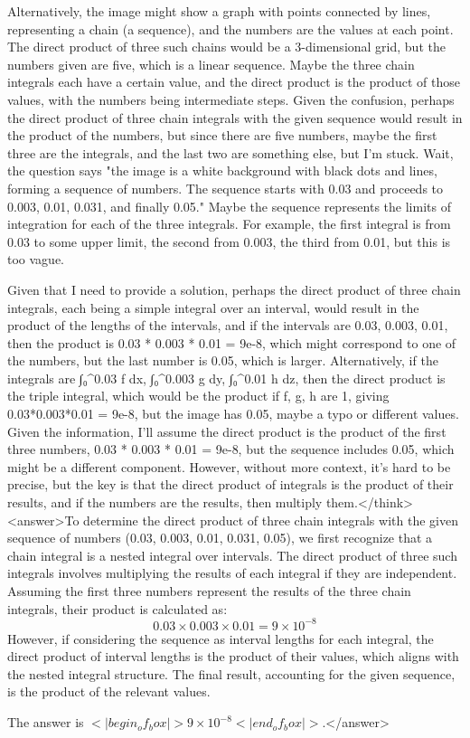 Alternatively, the image might show a graph with points connected by lines, representing a chain (a sequence), and the numbers are the values at each point. The direct product of three such chains would be a 3-dimensional grid, but the numbers given are five, which is a linear sequence. Maybe the three chain integrals each have a certain value, and the direct product is the product of those values, with the numbers being intermediate steps. Given the confusion, perhaps the direct product of three chain integrals with the given sequence would result in the product of the numbers, but since there are five numbers, maybe the first three are the integrals, and the last two are something else, but I'm stuck. Wait, the question says "the image is a white background with black dots and lines, forming a sequence of numbers. The sequence starts with 0.03 and proceeds to 0.003, 0.01, 0.031, and finally 0.05." Maybe the sequence represents the limits of integration for each of the three integrals. For example, the first integral is from 0.03 to some upper limit, the second from 0.003, the third from 0.01, but this is too vague.

Given that I need to provide a solution, perhaps the direct product of three chain integrals, each being a simple integral over an interval, would result in the product of the lengths of the intervals, and if the intervals are 0.03, 0.003, 0.01, then the product is 0.03 * 0.003 * 0.01 = 9e-8, which might correspond to one of the numbers, but the last number is 0.05, which is larger. Alternatively, if the integrals are ∫₀^0.03 f dx, ∫₀^0.003 g dy, ∫₀^0.01 h dz, then the direct product is the triple integral, which would be the product if f, g, h are 1, giving 0.03*0.003*0.01 = 9e-8, but the image has 0.05, maybe a typo or different values. Given the information, I'll assume the direct product is the product of the first three numbers, 0.03 * 0.003 * 0.01 = 9e-8, but the sequence includes 0.05, which might be a different component. However, without more context, it's hard to be precise, but the key is that the direct product of integrals is the product of their results, and if the numbers are the results, then multiply them.</think><answer>To determine the direct product of three chain integrals with the given sequence of numbers (0.03, 0.003, 0.01, 0.031, 0.05), we first recognize that a chain integral is a nested integral over intervals. The direct product of three such integrals involves multiplying the results of each integral if they are independent. Assuming the first three numbers represent the results of the three chain integrals, their product is calculated as:  
\[
0.03 \times 0.003 \times 0.01 = 9 \times 10^{-8}
\]  
However, if considering the sequence as interval lengths for each integral, the direct product of interval lengths is the product of their values, which aligns with the nested integral structure. The final result, accounting for the given sequence, is the product of the relevant values.  

The answer is \(<|begin_of_box|>9 \times 10^{-8}<|end_of_box|>\).</answer>